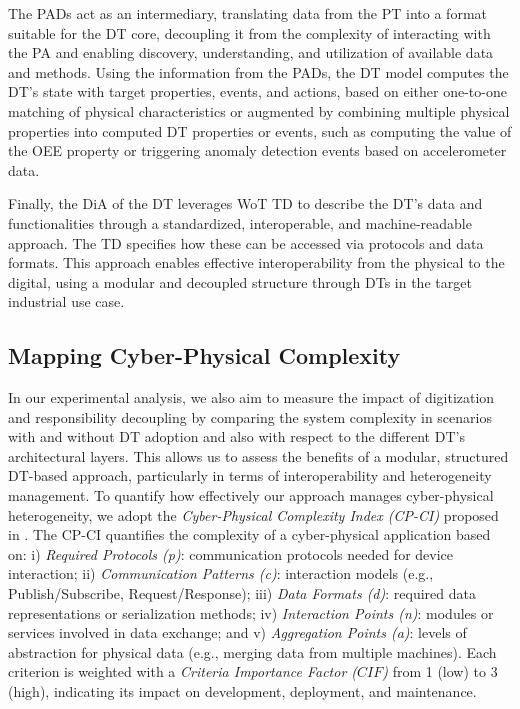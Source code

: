 The \acp{PAD} act as an intermediary, translating data from the PT into a format suitable for the DT core, decoupling it from the complexity of interacting with the \ac{PA} and enabling discovery, understanding, and utilization of available data and methods.
Using the information from the \acp{PAD}, the \ac{DT} model computes the \ac{DT}'s state with target properties, events, and actions, based on either one-to-one matching of physical characteristics or augmented by combining multiple physical properties into computed \ac{DT} properties or events, such as computing the value of the \ac{OEE} property or triggering anomaly detection events based on accelerometer data. 

Finally, the \ac{DiA} of the \ac{DT} leverages \ac{WoT} \ac{TD} to describe the DT's data and functionalities through a standardized, interoperable, and machine-readable approach.
The \ac{TD} specifies how these can be accessed via protocols and data formats.
This approach enables effective interoperability from the physical to the digital, using a modular and decoupled structure through \acp{DT} in the target industrial use case.

\subsection{Mapping Cyber-Physical Complexity}
\label{sec:mappint_cp_complexity}

In our experimental analysis, we also aim to measure the impact of digitization and responsibility decoupling by comparing the system complexity in scenarios with and without \ac{DT} adoption and also with respect to the different \ac{DT}'s architectural layers.
This allows us to assess the benefits of a modular, structured DT-based approach, particularly in terms of interoperability and heterogeneity management.
To quantify how effectively our approach manages cyber-physical heterogeneity, we adopt the \textit{Cyber-Physical Complexity Index (CP-CI)} proposed in \cite{lippi_dt_causality_learning, LOMBARDO2024107203}.
The CP-CI quantifies the complexity of a cyber-physical application based on:
i) \textit{Required Protocols (p)}: communication protocols needed for device interaction;
ii) \textit{Communication Patterns (c)}: interaction models (e.g., Publish/Subscribe, Request/Response);
iii) \textit{Data Formats (d)}: required data representations or serialization methods;
iv) \textit{Interaction Points (n)}: modules or services involved in data exchange; and
v) \textit{Aggregation Points (a)}: levels of abstraction for physical data (e.g., merging data from multiple machines).
Each criterion is weighted with a \textit{Criteria Importance Factor ($CIF$)} from 1 (low) to 3 (high), indicating its impact on development, deployment, and maintenance.

